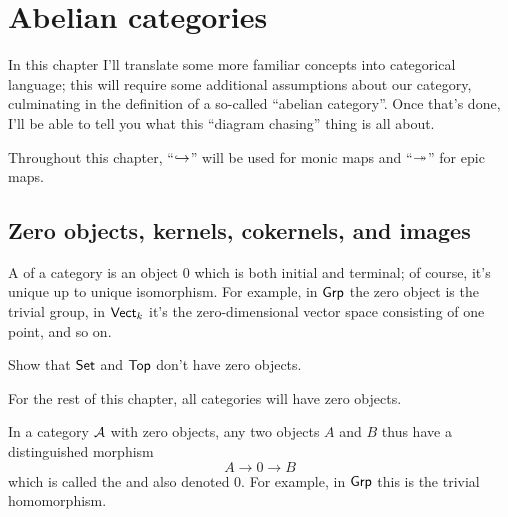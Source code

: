 \chapter{Abelian categories}
\label{ch:abelian_categories}
In this chapter I'll translate some more familiar concepts into categorical language;
this will require some additional assumptions about our category,
culminating in the definition of a so-called ``abelian category''.
Once that's done, I'll be able to tell you what this ``diagram chasing'' thing is all about.

Throughout this chapter, ``$\injto$'' will be used for monic maps and ``$\surjto$'' for epic maps.

\section{Zero objects, kernels, cokernels, and images}

A  of a category is an object $0$ which is both initial and terminal;
of course, it's unique up to unique isomorphism.
For example, in $\catname{Grp}$ the zero object is the trivial group,
in $\catname{Vect}_k$ it's the zero-dimensional vector space consisting of one point, and so on.
\begin{ques}
	Show that $\catname{Set}$ and $\catname{Top}$ don't have zero objects.
\end{ques}
For the rest of this chapter, all categories will have zero objects.

In a category $\AA$ with zero objects, any two objects $A$ and $B$ thus have a distinguished morphism
\[ A \to 0 \to B \]
which is called the  and also denoted $0$.
For example, in $\catname{Grp}$ this is the trivial homomorphism.


